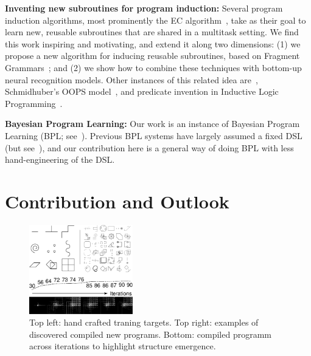 \documentclass{article}
\begin{document}
 


 

 \noindent \textbf{Inventing new subroutines for program induction:}
 Several program induction algorithms, most prominently the EC algorithm~\cite{Dechter:2013:BLV:2540128.2540316}, take as their goal to learn new, reusable subroutines that are shared in a multitask setting. We find this work inspiring and motivating,
 and extend it along two dimensions: (1) we propose a new algorithm for
 inducing reusable subroutines, based on Fragment Grammars~\cite{tim};
 and (2) we show how to combine these techniques with bottom-up neural recognition models.
 Other instances of this related idea are~\cite{DBLP:conf/icml/LiangJK10}, Schmidhuber's OOPS model~\cite{schmidhuber2004optimal}, and predicate invention in Inductive Logic Programming~\cite{DBLP:conf/ecai/LinDETM14}.
 
\noindent\textbf{Bayesian Program
 Learning:} Our work is an instance of
 Bayesian Program
 Learning (BPL; see~\citep{lake2015human,Dechter:2013:BLV:2540128.2540316,ellis2016sampling,DBLP:conf/icml/LiangJK10}). Previous BPL systems have largely assumed a fixed DSL (but see~\cite{DBLP:conf/icml/LiangJK10}),
 and our contribution here is a general way of doing BPL with less hand-engineering of the DSL.
 
 \section{Contribution and Outlook}

\begin{figure}
  \begin{center}
    \includegraphics[width = 0.4\textwidth]{figures/geomCompiled.eps} 
  \end{center}
  \caption{
  Top left: hand crafted traning targets. Top right: examples of
  discovered compiled new programs. Bottom: compiled programm across iterations
  to highlight structure emergence.
  }\label{geomCompiled} 
\end{figure}
\end{document}
